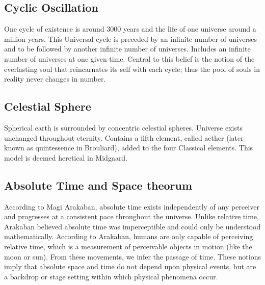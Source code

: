 \begin{multicols}{2}
\subsection{Cyclic Oscillation} One cycle of existence is around 3000 years and the life of one universe around a million years. This Universal cycle is preceded by an infinite number of universes and to be followed by another infinite number of universes. Includes an infinite number of universes at one given time. Central to this belief is the notion of the everlasting soul that reincarnates its self with each cycle; thus the pool of souls in reality never changes in number.
\subsection{Celestial Sphere} Spherical earth is surrounded by concentric celestial spheres. Universe exists unchanged throughout eternity. Contains a fifth element, called aether (later known as quintessence in Brouliard), added to the four Classical elements. This model is deemed heretical in Midgaard.

\subsection{Absolute Time and Space theorum} According to Magi Arakaban, absolute time exists independently of any perceiver and progresses at a consistent pace throughout the universe. Unlike relative time, Arakaban believed absolute time was imperceptible and could only be understood mathematically. According to Arakaban, humans are only capable of perceiving relative time, which is a measurement of perceivable objects in motion (like the moon or sun). From these movements, we infer the passage of time. These notions imply that absolute space and time do not depend upon physical events, but are a backdrop or stage setting within which physical phenomena occur.

\end{multicols}